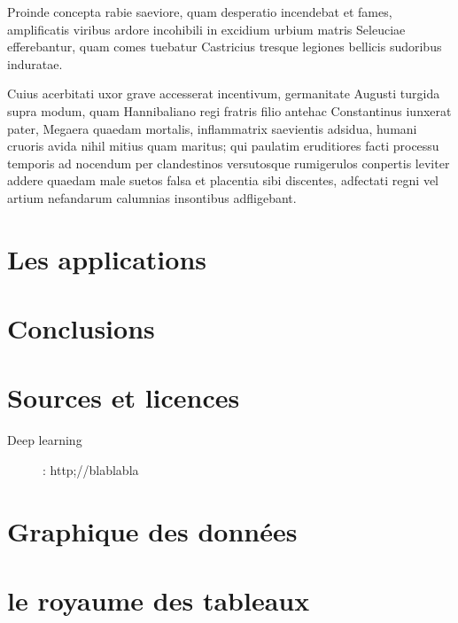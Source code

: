 \documentclass{report}
\begin{document}
Proinde concepta rabie saeviore, quam desperatio incendebat et fames, amplificatis viribus ardore incohibili in excidium urbium matris Seleuciae efferebantur, quam comes tuebatur Castricius tresque legiones bellicis sudoribus induratae.

Cuius acerbitati uxor grave accesserat incentivum, germanitate Augusti turgida supra modum, quam Hannibaliano regi fratris filio antehac Constantinus iunxerat pater, Megaera quaedam mortalis, inflammatrix saevientis adsidua, humani cruoris avida nihil mitius quam maritus; qui paulatim eruditiores facti processu temporis ad nocendum per clandestinos versutosque rumigerulos conpertis leviter addere quaedam male suetos falsa et placentia sibi discentes, adfectati regni vel artium nefandarum calumnias insontibus adfligebant.


\chapter{Les applications}

\chapter*{Conclusions}

\chapter*{Sources et licences}

\begin{description}
 \item [Deep learning]: http;//blablabla
 
\end{description}  

\appendix

\chapter{Graphique des données}

\chapter{le royaume des tableaux}
\end{document}
